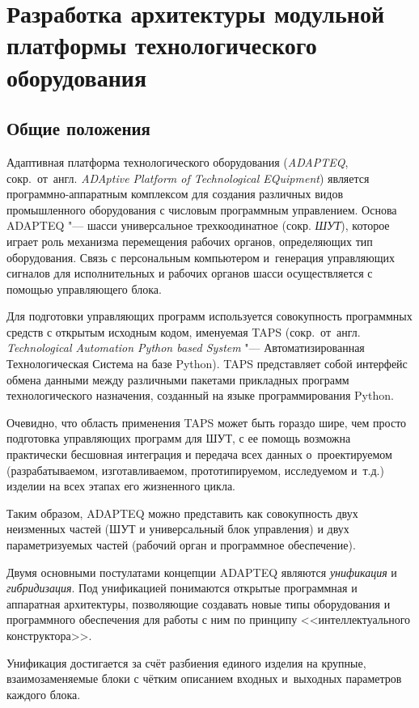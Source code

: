 \chapter{Разработка архитектуры модульной платформы технологического оборудования}\label{ch:ch2}

\section{Общие положения}

Адаптивная платформа технологического оборудования (\textit{ADAPTEQ}, сокр.~от~англ. \textit{ADAptive Platform of Technological EQuipment}) является программно-аппаратным комплексом для создания различных видов промышленного оборудования с числовым программным управлением. Основа ADAPTEQ "--- шасси универсальное трехкоодинатное (сокр. \textit{ШУТ}), которое играет роль механизма перемещения рабочих органов, определяющих тип оборудования. Связь с персональным компьютером и~генерация управляющих сигналов для исполнительных и рабочих органов шасси осуществляется с помощью управляющего блока.

Для подготовки управляющих программ используется совокупность программных средств с открытым исходным кодом, именуемая TAPS (сокр.~от~англ. \textit{Technological Automation Python based System} "--- Автоматизированная Технологическая Система на базе Python). TAPS представляет собой интерфейс обмена данными между различными пакетами прикладных программ технологического назначения, созданный на языке программирования Python.

Очевидно, что область применения TAPS может быть гораздо шире, чем просто подготовка управляющих программ для ШУТ, с ее помощь возможна практически бесшовная интеграция и передача всех данных о~проектируемом (разрабатываемом, изготавливаемом, прототипируемом, исследуемом и~т.\:д.) изделии на всех этапах его жизненного цикла.

Таким образом, ADAPTEQ можно представить как совокупность двух неизменных частей (ШУТ и универсальный блок управления) и двух параметризуемых частей (рабочий орган и программное обеспечение).

Двумя основными постулатами концепции ADAPTEQ являются \textit{унификация} и \textit{гибридизация}. Под унификацией понимаются открытые программная и аппаратная архитектуры, позволяющие создавать новые типы оборудования и программного обеспечения для работы с ним по принципу <<интеллектуального конструктора>>.

Унификация достигается за счёт разбиения единого изделия на крупные, взаимозаменяемые блоки с чётким описанием входных и~выходных параметров каждого блока.

